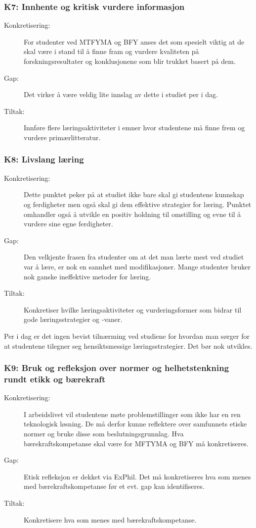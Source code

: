 \subsubsection{K7: Innhente og kritisk vurdere informasjon}
\begin{description}
\item[Konkretisering:] For studenter ved MTFYMA og BFY anses det som spesielt viktig at de skal være i stand til å finne fram og vurdere kvaliteten på forskningsresultater og konklusjonene som blir trukket basert på dem. 
\item[Gap:] Det virker å være veldig lite innslag av dette i studiet per i dag.
\item[Tiltak:] Innføre flere læringsaktiviteter i emner hvor studentene må finne frem og vurdere primærlitteratur.
\end{description}


\subsubsection{K8: Livslang læring}
\begin{description}
\item[Konkretisering:] Dette punktet peker på at studiet ikke bare skal gi studentene kunnskap og ferdigheter men også skal gi dem effektive strategier for læring. Punktet omhandler også å utvikle en positiv holdning til omstilling og evne til å vurdere sine egne ferdigheter.
\item[Gap:] Den velkjente frasen fra studenter om at det man lærte mest ved studiet var å lære, er nok en sannhet med modifikasjoner. Mange studenter bruker nok ganske ineffektive metoder for læring. 
\item[Tiltak:] Konkretiser hvilke læringsaktiviteter og vurderingsformer som bidrar til gode læringsstrategier og -vaner.
\end{description}  

Per i dag er det ingen bevist tilnærming ved studiene for hvordan man sørger for at studentene tilegner seg hensiktsmessige læringsstrategier. Det bør nok utvikles.

\subsubsection{K9: Bruk og refleksjon over normer og helhetstenkning rundt etikk og bærekraft} 
\begin{description}
\item[Konkretisering:] I arbeidslivet vil studentene møte problemstillinger som ikke har en ren teknologisk løsning. De må derfor kunne reflektere over samfunnets etiske normer og bruke disse som beslutningsgrunnlag. Hva bærekraftskompetanse skal være for MFTYMA og BFY må konkretiseres. 
\item[Gap:] Etisk refleksjon er dekket via ExPhil. Det må konkretiseres hva som menes med bærekraftskompetanse før et evt. gap kan identifiseres.
\item[Tiltak:] Konkretisere hva som menes med bærekraftskompetanse.
\end{description}

